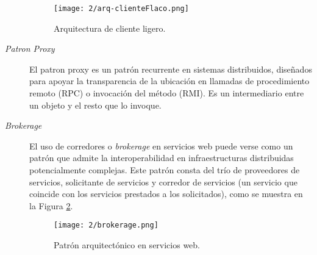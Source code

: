 \begin{description}
	\begin{figure}[h]
		  \begin{center} %
		\texttt{[image: 2/arq-clienteFlaco.png]}
		\caption{Arquitectura de cliente ligero. }
		\label{fig:Arq-flaco}
	 \end{center} 
 \end{figure} 
	
 
	
		\item[\textit{Patron Proxy}] El \gls{patron proxy} es un patrón  recurrente en sistemas distribuidos, diseñados  para apoyar la transparencia de la ubicación en llamadas de procedimiento remoto (RPC) o invocación del método (RMI).  Es un intermediario entre un objeto y el resto que lo invoque.  
		
		\item[\textit{Brokerage}]
		  
	 	 El uso de corredores o \textit{brokerage}  en servicios web puede verse  como un patrón que admite la interoperabilidad en infraestructuras distribuidas potencialmente complejas.	
		 Este patrón consta del trío de proveedores de servicios, solicitante de servicios y corredor de servicios (un servicio que coincide con los servicios prestados a los solicitados), como se muestra en la Figura \ref{fig:brokerage}.
		 
		 
		
	
				
		\begin{figure}[h]  
			\begin{center}%
			\texttt{[image: 2/brokerage.png]} 
			\caption{Patr\'on arquitect\'onico en servicios web. }
			\label{fig:brokerage}
		 \end{center} 
	 \end{figure} 
		
		
			

\end{description}
